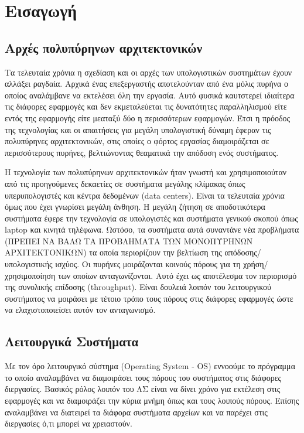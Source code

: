 \chapter{Εισαγωγή}
\section{Αρχές πολυπύρηνων αρχιτεκτονικών}
Τα τελευταία χρόνια η σχεδίαση και οι αρχές των υπολογιστικών συστημάτων έχουν
αλλάξει ραγδαία. Αρχικά ένας επεξεργαστής αποτελούνταν από ένα μόλις πυρήνα ο
οποίος  αναλάμβανε να εκτελέσει όλη την εργασία. Αυτό φυσικά καυτστερεί
ιδιαίτερα τις διάφορες εφαρμογές και δεν εκμεταλεύεται τις δυνατότητες
παραλληλισμού είτε εντός της εφαρμογής είτε μεαταξύ δύο η περισσότερων
εφαρμογών. Έτσι η πρόοδος της τεχνολογίας και οι απαιτήσεις για μεγάλη
υπολογιστική δύναμη έφεραν τις πολυπύρηνες αρχιτεκτονικών, στις οποίες ο φόρτος
εργασίας διαμοιράζεται σε περισσότερους πυρήνες, βελτιώνοντας θεαματικά την
απόδοση ενός συστήματος.

Η τεχνολογία των πολυπύρηνων αρχιτεκτονικών ήταν γνωστή και χρησιμοποιούταν από
τις προηγούμενες δεκαετίες σε συστήματα μεγάλης κλίμακας όπως υπερυπολογιστές
και κέντρα δεδομένων (data centers). Είναι τα τελευταία χρόνια όμως που έχει
γνωρίσει μεγάλη άνθηση. Η μεγάλη ζήτηση σε αποδοτικότερα συστήματα έφερε την
τεχνολογία σε υπολογιστές και συστήματα γενικού σκοπού όπως laptop και κινητά
τηλέφωνα.
Ωστόσο, τα συστήματα αυτά συναντάνε νέα προβλήματα (ΠΡΕΠΕΙ ΝΑ ΒΑΛΩ ΤΑ ΠΡΟΒΛΗΜΑΤΑ
ΤΩΝ ΜΟΝΟΠΥΡΗΝΩΝ ΑΡΧΙΤΕΚΤΟΝΙΚΩΝ) τα οποία περιορίζουν την βελτίωση της
απόδοσης/υπολογιστικής ισχύος. Οι πυρήνες μοιράζονται κοινούς πόρους για τη
χρήση/χρησιμοποίηση των οποίων ανταγωνίζονται. Αυτό έχει ως αποτέλεσμα τον
περιορισμό της συνολικής επίδοσης (throughput). Είναι δουλειά λοιπόν του
λειτουργικού συστήματος να μοιράσει με τέτοιο τρόπο τους πόρους στις διάφορες
εφαρμογές ώστε να ελαχιστοποιείσει αυτόν τον ανταγωνισμό.
\section{Λειτουργικά Συστήματα}
Με τον όρο λειτουργικό σύστημα (Operating System - OS) εννοούμε το πρόγραμμα το
οποίο αναλαμβάνει να διαμοιράσει τους πόρους του συστήματος στις διάφορες
διεργασίες. Βασικός ρόλος λοιπόν του ΛΣ είναι να δίνει χρόνο για εκτέλεση στις
εφαρμογές και να διαμοιράζει την κύρια μνήμη όπως και τους λοιπούς πόρους.
Επίσης αναλαμβάνει να διατειρεί τα διάφορα συστήματα αρχείων και να παρέχει στις
διεργασίες ό,τι μπορεί να χρειαστούν.

